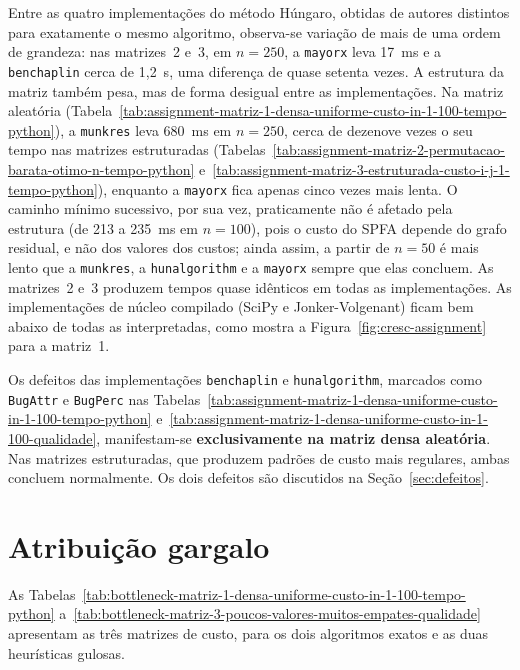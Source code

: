 Entre as quatro implementações do método Húngaro, obtidas de autores distintos
para exatamente o mesmo algoritmo, observa-se variação de mais de uma ordem de
grandeza: nas matrizes~2 e~3, em $n = 250$, a \texttt{mayorx} leva 17~ms e a
\texttt{benchaplin} cerca de 1{,}2~s, uma diferença de quase setenta vezes. A estrutura da matriz também pesa, mas de forma desigual
entre as implementações. Na matriz aleatória
(Tabela~\ref{tab:assignment-matriz-1-densa-uniforme-custo-in-1-100-tempo-python}),
a \texttt{munkres} leva 680~ms em $n = 250$, cerca de dezenove vezes o seu tempo
nas matrizes estruturadas
(Tabelas~\ref{tab:assignment-matriz-2-permutacao-barata-otimo-n-tempo-python}
e~\ref{tab:assignment-matriz-3-estruturada-custo-i-j-1-tempo-python}), enquanto a
\texttt{mayorx} fica apenas cinco vezes mais lenta. O caminho mínimo sucessivo,
por sua vez, praticamente não é afetado pela estrutura (de 213 a 235~ms em
$n = 100$), pois o custo do SPFA depende do grafo residual, e não dos valores dos
custos; ainda assim, a partir de $n = 50$ é mais lento que a \texttt{munkres}, a
\texttt{hunalgorithm} e a \texttt{mayorx} sempre que elas concluem. As matrizes~2 e~3 produzem tempos quase idênticos em todas as
implementações. As implementações de núcleo compilado (SciPy e Jonker-Volgenant) ficam bem
abaixo de todas as interpretadas, como mostra a Figura~\ref{fig:cresc-assignment}
para a matriz~1.

Os defeitos das implementações \texttt{benchaplin} e \texttt{hunalgorithm}, marcados como
\texttt{BugAttr} e \texttt{BugPerc} nas
Tabelas~\ref{tab:assignment-matriz-1-densa-uniforme-custo-in-1-100-tempo-python}
e~\ref{tab:assignment-matriz-1-densa-uniforme-custo-in-1-100-qualidade},
manifestam-se \textbf{exclusivamente na matriz densa aleatória}. Nas matrizes
estruturadas, que produzem padrões de custo mais regulares, ambas concluem
normalmente. Os dois defeitos são discutidos na Seção~\ref{sec:defeitos}.

\section{Atribuição gargalo}
\label{sec:res_bottleneck}

As Tabelas~\ref{tab:bottleneck-matriz-1-densa-uniforme-custo-in-1-100-tempo-python}
a~\ref{tab:bottleneck-matriz-3-poucos-valores-muitos-empates-qualidade} apresentam
as três matrizes de custo, para os dois algoritmos exatos e as duas heurísticas
gulosas.

